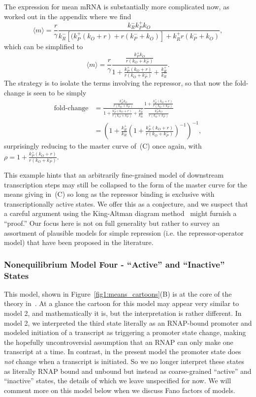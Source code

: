 The expression for mean mRNA is substantially more complicated now, as worked
out in the appendix where we find
\begin{equation}
\langle m\rangle = \frac{r}{\gamma}
        \frac{k_R^- k_P^+ k_O}
        {k_R^- [(k_P^+ (k_O + r) + r(k_P^- + k_O)] + k_R^+ r(k_P^- + k_O)},
\end{equation}
which can be simplified to
\begin{equation}
\langle m\rangle
= \frac{r}{\gamma}
\frac{\frac{k_P^+ k_O}{r(k_O + k_P^-)}}
        {1 + \frac{k_P^+ (k_O + r)}{r(k_O + k_P^-)} + \frac{k_R^+}{k_R^-}}.
\end{equation}
The strategy is to isolate the terms involving the repressor, so that now the
fold-change is seen to be simply
\begin{align}
\text{fold-change}
&= \frac{\frac{k_P^+ k_O}{r(k_O + k_P^-)}}
        {1 + \frac{k_P^+ (k_O + r)}{r(k_O + k_P^-)} + \frac{k_R^+}{k_R^-}}
        \frac{1 + \frac{k_P^+ (k_O + r)}{r(k_O + k_P^-)}}
                {\frac{k_P^+ k_O}{r(k_O + k_P^-)}}
\\
&= \left(
        1 + \frac{k_R^+}{k_R^-}
        \left(1 + \frac{k_P^+ (k_O + r)}{r(k_O + k_P^-)}\right)^{-1}
\right)^{-1},
\end{align}
surprisingly reducing to the master curve of~(C) once again, with $\rho = 1 +
\frac{k_P^+ (k_O + r)}{r(k_O + k_P^-)}$.

This example hints that an arbitrarily fine-grained model of downstream
transcription steps may still be collapsed to the form of the master curve for
the means giving
in~(C) so long as the repressor binding is exclusive with
transcriptionally active states. We offer this as a conjecture, and we suspect
that a careful argument using the King-Altman diagram method~\cite{King1956,
Hill1966} might furnish a ``proof.'' Our focus here is not on full generality
but rather to survey an assortment of plausible models for simple
repression (i.e. the repressor-operator model) that have been proposed
in the literature.

\subsubsection{Nonequilibrium Model Four - ``Active'' and ``Inactive'' States}
This model, shown in Figure~\ref{fig1:means_cartoons}(B)   is at the core of the theory in~\cite{Razo-Mejia2020}. At a glance
the cartoon for this model may appear very similar to model 2, and
mathematically it is, but the interpretation is rather different. In model 2, we
interpreted the third state literally as an RNAP-bound promoter and modeled
initiation of a transcript as triggering a promoter state change, making the
hopefully uncontroversial assumption that an RNAP can only make one transcript
at a time. In contrast, in the present model the promoter state does
\textit{not} change when a transcript is initiated. So we no longer interpret
these states as literally RNAP bound and unbound but instead as coarse-grained
``active'' and ``inactive'' states, the details of which we leave unspecified
for now. We will comment more on this model below when we discuss Fano factors
of models.

